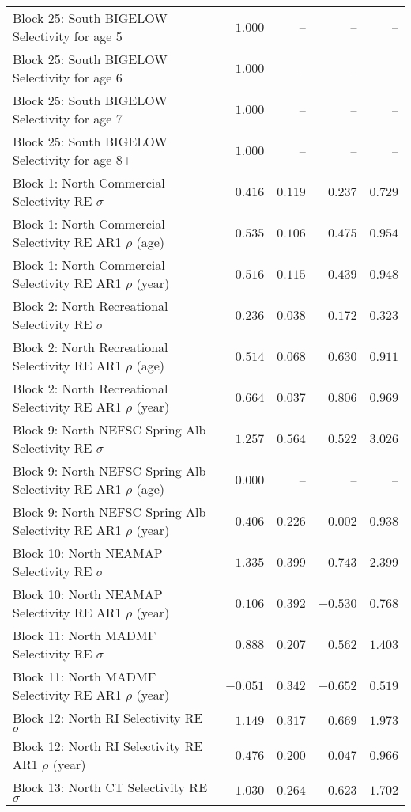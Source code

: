 \documentclass[
]{article}
\begin{document}
\begin{landscape}
\begin{longtable}[t]{lrrrr}
Block 25: South BIGELOW Selectivity for age 5 & $1.000$ & -- & -- & --\\
\addlinespace
Block 25: South BIGELOW Selectivity for age 6 & $1.000$ & -- & -- & --\\
Block 25: South BIGELOW Selectivity for age 7 & $1.000$ & -- & -- & --\\
Block 25: South BIGELOW Selectivity for age 8+ & $1.000$ & -- & -- & --\\
Block 1: North Commercial Selectivity RE $\sigma$ & $0.416$ & $0.119$ & $0.237$ & $0.729$\\
Block 1: North Commercial Selectivity RE AR1 $\rho$ (age) & $0.535$ & $0.106$ & $0.475$ & $0.954$\\
\addlinespace
Block 1: North Commercial Selectivity RE AR1 $\rho$ (year) & $0.516$ & $0.115$ & $0.439$ & $0.948$\\
Block 2: North Recreational Selectivity RE $\sigma$ & $0.236$ & $0.038$ & $0.172$ & $0.323$\\
Block 2: North Recreational Selectivity RE AR1 $\rho$ (age) & $0.514$ & $0.068$ & $0.630$ & $0.911$\\
Block 2: North Recreational Selectivity RE AR1 $\rho$ (year) & $0.664$ & $0.037$ & $0.806$ & $0.969$\\
Block 9: North NEFSC Spring Alb Selectivity RE $\sigma$ & $1.257$ & $0.564$ & $0.522$ & $3.026$\\
\addlinespace
Block 9: North NEFSC Spring Alb Selectivity RE AR1 $\rho$ (age) & $0.000$ & -- & -- & --\\
Block 9: North NEFSC Spring Alb Selectivity RE AR1 $\rho$ (year) & $0.406$ & $0.226$ & $0.002$ & $0.938$\\
Block 10: North NEAMAP Selectivity RE $\sigma$ & $1.335$ & $0.399$ & $0.743$ & $2.399$\\
Block 10: North NEAMAP Selectivity RE AR1 $\rho$ (year) & $0.106$ & $0.392$ & $-0.530$ & $0.768$\\
Block 11: North MADMF Selectivity RE $\sigma$ & $0.888$ & $0.207$ & $0.562$ & $1.403$\\
\addlinespace
Block 11: North MADMF Selectivity RE AR1 $\rho$ (year) & $-0.051$ & $0.342$ & $-0.652$ & $0.519$\\
Block 12: North RI Selectivity RE $\sigma$ & $1.149$ & $0.317$ & $0.669$ & $1.973$\\
Block 12: North RI Selectivity RE AR1 $\rho$ (year) & $0.476$ & $0.200$ & $0.047$ & $0.966$\\
Block 13: North CT Selectivity RE $\sigma$ & $1.030$ & $0.264$ & $0.623$ & $1.702$\\

\end{longtable}
\end{landscape}
\end{document}
